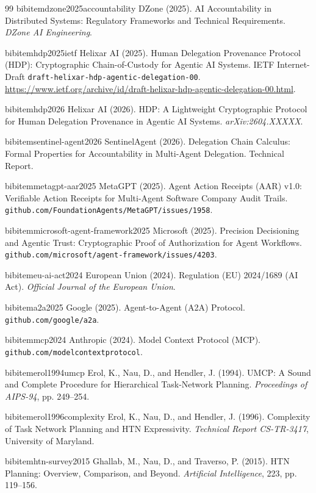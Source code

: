 \begin{thebibliography}{99}
bibitem{dzone2025accountability}
DZone (2025). AI Accountability in Distributed Systems: Regulatory Frameworks and Technical Requirements. \textit{DZone AI Engineering}.

bibitem{hdp2025ietf}
Helixar AI (2025). Human Delegation Provenance Protocol (HDP): Cryptographic Chain-of-Custody for Agentic AI Systems. IETF Internet-Draft \texttt{draft-helixar-hdp-agentic-delegation-00}. \url{https://www.ietf.org/archive/id/draft-helixar-hdp-agentic-delegation-00.html}.

bibitem{hdp2026}
Helixar AI (2026). HDP: A Lightweight Cryptographic Protocol for Human Delegation Provenance in Agentic AI Systems. \textit{arXiv:2604.XXXXX}.

bibitem{sentinel-agent2026}
SentinelAgent (2026). Delegation Chain Calculus: Formal Properties for Accountability in Multi-Agent Delegation. Technical Report.

bibitem{metagpt-aar2025}
MetaGPT (2025). Agent Action Receipts (AAR) v1.0: Verifiable Action Receipts for Multi-Agent Software Company Audit Trails. \texttt{github.com/FoundationAgents/MetaGPT/issues/1958}.

bibitem{microsoft-agent-framework2025}
Microsoft (2025). Precision Decisioning and Agentic Trust: Cryptographic Proof of Authorization for Agent Workflows. \texttt{github.com/microsoft/agent-framework/issues/4203}.

bibitem{eu-ai-act2024}
European Union (2024). Regulation (EU) 2024/1689 (AI Act). \textit{Official Journal of the European Union}.

bibitem{a2a2025}
Google (2025). Agent-to-Agent (A2A) Protocol. \texttt{github.com/google/a2a}.

bibitem{mcp2024}
Anthropic (2024). Model Context Protocol (MCP). \texttt{github.com/modelcontextprotocol}.

bibitem{erol1994umcp}
Erol, K., Nau, D., and Hendler, J. (1994). UMCP: A Sound and Complete Procedure for Hierarchical Task-Network Planning. \textit{Proceedings of AIPS-94}, pp. 249--254.

bibitem{erol1996complexity}
Erol, K., Nau, D., and Hendler, J. (1996). Complexity of Task Network Planning and HTN Expressivity. \textit{Technical Report CS-TR-3417}, University of Maryland.

bibitem{htn-survey2015}
Ghallab, M., Nau, D., and Traverso, P. (2015). HTN Planning: Overview, Comparison, and Beyond. \textit{Artificial Intelligence}, 223, pp. 119--156.


\end{thebibliography}
